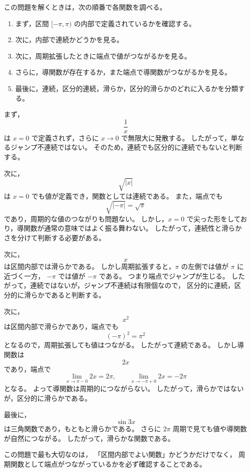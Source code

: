 \begin{strategy}
	この問題を解くときは，次の順番で各関数を調べる。
	
	\begin{enumerate}
		\item まず，区間 \([-\pi,\pi)\) の内部で定義されているかを確認する。
		\item 次に，内部で連続かどうかを見る。
		\item 次に，周期拡張したときに端点で値がつながるかを見る。
		\item さらに，導関数が存在するか，また端点で導関数がつながるかを見る。
		\item 最後に，連続，区分的連続，滑らか，区分的滑らかのどれに入るかを分類する。
	\end{enumerate}
	
	まず，
	\[
	\frac{1}{x}
	\]
	は \(x=0\) で定義されず，さらに \(x\to 0\) で無限大に発散する。
	したがって，単なるジャンプ不連続ではない。
	そのため，連続でも区分的に連続でもないと判断する。
	
	次に，
	\[
	\sqrt{|x|}
	\]
	は \(x=0\) でも値が定義でき，関数としては連続である。
	また，端点でも
	\[
	\sqrt{|-\pi|}=\sqrt{\pi}
	\]
	であり，周期的な値のつながりも問題ない。
	しかし，\(x=0\) で尖った形をしており，導関数が通常の意味ではよく振る舞わない。
	したがって，連続性と滑らかさを分けて判断する必要がある。
	
	次に，
	\[
	x
	\]
	は区間内部では滑らかである。
	しかし周期拡張すると，\(\pi\) の左側では値が \(\pi\) に近づく一方，
	\(-\pi\) では値が \(-\pi\) である。
	つまり端点でジャンプが生じる。
	したがって，連続ではないが，ジャンプ不連続は有限個なので，
	区分的に連続，区分的に滑らかであると判断する。
	
	次に，
	\[
	x^2
	\]
	は区間内部で滑らかであり，端点でも
	\[
	(-\pi)^2=\pi^2
	\]
	となるので，周期拡張しても値はつながる。
	したがって連続である。
	しかし導関数は
	\[
	2x
	\]
	であり，端点で
	\[
	\lim_{x\to \pi-0}2x=2\pi,
	\qquad
	\lim_{x\to -\pi+0}2x=-2\pi
	\]
	となる。
	よって導関数は周期的につながらない。
	したがって，滑らかではないが，区分的に滑らかである。
	
	最後に，
	\[
	\sin 3x
	\]
	は三角関数であり，もともと滑らかである。
	さらに \(2\pi\) 周期で見ても値や導関数が自然につながる。
	したがって，滑らかな関数である。
	
	この問題で最も大切なのは，
	「区間内部でよい関数」かどうかだけでなく，
	周期関数として端点がつながっているかを必ず確認することである。
\end{strategy}